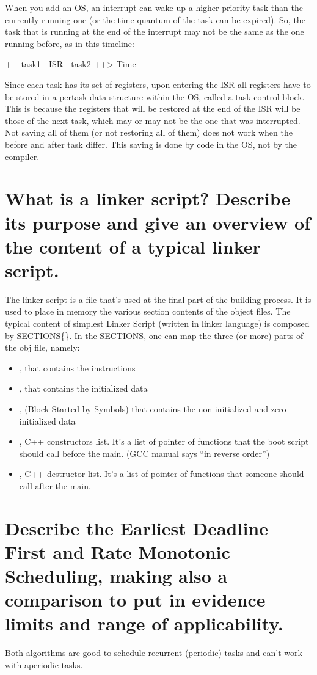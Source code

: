 When you add an OS, an interrupt can wake up a higher priority task than the currently running one (or the time quantum of the task can be expired). So, the task that is running at the end of the interrupt may not be the same as the one running before, as in this timeline: 


++ task1 | ISR | task2 ++> Time


Since each task has its set of registers, upon entering the ISR all registers have to be stored in a per­task data structure within the OS, called a task control block. This is because the registers that will be restored at the end of the ISR will be those of the next task, which may or may not be the one that was interrupted. Not saving all of them (or not restoring all of them) does not work when the before and after task differ. This saving is done by code in the OS, not by the compiler.

\section{What is a linker script? Describe its purpose and give an overview of the content of a typical linker script.}
The linker script is a file that's used at the final part of the building process. It is used to place in memory the various section contents of the object files. 
The typical content of simplest Linker Script (written in linker language) is composed by SECTIONS\{\}.
In the SECTIONS, one can map the three (or more) parts of the obj file, namely:
\begin{itemize}
	\item {}, that contains the instructions
	\item {}, that contains the initialized data
	\item {}, (Block Started by Symbols) that contains the non-initialized and zero-initialized data
    \item {}, C++ constructors list. It's a list of pointer of functions that the boot script should call before the main. (GCC manual says ``in reverse order'')
    \item {}, C++ destructor list. It's a list of pointer of functions that someone should call after the main.
\end{itemize}


\section{Describe the Earliest Deadline First and Rate Monotonic Scheduling, making also a comparison to put in evidence limits and range of applicability.}
\label{rmsedf}
Both algorithms are good to schedule recurrent (periodic) tasks and can't work with aperiodic tasks.

